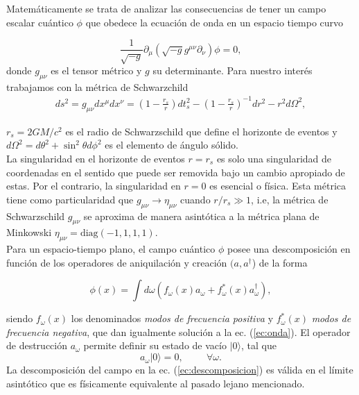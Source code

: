Matem\'{a}ticamente se trata de analizar las consecuencias de tener un campo escalar cu\'{a}ntico $\phi$ que obedece la ecuaci\'{o}n de onda en un espacio tiempo curvo

\begin{equation}\label{ec:onda}
\frac{1}{\sqrt{-g}}\partial_{\mu}\left(\sqrt{-g}g^{\mu \nu}\partial_{\nu}\right)\phi=0,
\end{equation} 
donde $g_{\mu \nu}$ es el tensor m\'{e}trico y $g$ su determinante. Para nuestro inter\'{e}s trabajamos con la m\'{e}trica de Schwarzchild
\begin{align}
 ds^2=g_{\mu \nu}dx^{\mu}dx^{\nu}=\left(1-\frac{r_s}{r}\right)dt_s^2-\left(1-\frac{r_s}{r}\right)^{-1}dr^2-r^2d\Omega^2,
\end{align}\label{eqn:metricsc}

$r_s=2GM/c^2$ es el radio de Schwarzschild que define el horizonte de eventos y $d\Omega^2=d\theta^2+\sin^2\theta d\phi^2$ es el elemento de \'{a}ngulo s\'{o}lido.\\
La singularidad en el horizonte de eventos $r=r_s$ es solo una singularidad de coordenadas en el sentido que puede ser removida bajo un cambio apropiado de estas. Por el contrario, la singularidad en $r=0$ es esencial o f\'{i}sica. Esta m\'{e}trica tiene como particularidad que $g_{\mu \nu}\rightarrow \eta_{\mu \nu}$ cuando $r/r_s\gg 1 $, i.e, la métrica de Schwarzschild $g_{\mu \nu}$ se aproxima de manera asint\'{o}tica a la métrica plana de Minkowski $\eta_{\mu \nu}=\text{diag}(-1,1,1,1)$.\\

Para un espacio-tiempo plano, el campo cu\'{a}ntico $\phi$ posee una descomposici\'{o}n en funci\'{o}n de los operadores de aniquilaci\'{o}n y creaci\'{o}n $(a,a^{\dagger}$) de la forma

 \begin{equation}\label{ec:descomposicion}
 \phi(x)= \int d\omega \left(f_{\omega}(x)a_{\omega}+f^*_{\omega}(x)a_{\omega}^{\dagger}\right),
 \end{equation}
 
siendo $f_{\omega}(x)$ los denominados \textit{modos de frecuencia positiva}  y $f_{\omega}^*(x)$ \textit{modos de frecuencia negativa}, que dan igualmente soluci\'{o}n a la ec. (\ref{ec:onda}). El operador  de destrucci\'{o}n $a_{\omega}$ permite definir su estado de vac\'{i}o $|0 \rangle$, tal que
 \begin{equation}
 a_{\omega}|0\rangle=0, \hspace{1cm} \forall \omega .
 \end{equation}
La descomposici\'{o}n del campo en la ec. (\ref{ec:descomposicion}) es v\'{a}lida en el l\'{i}mite asint\'{o}tico que es f\'{i}sicamente equivalente al pasado lejano mencionado.\\

